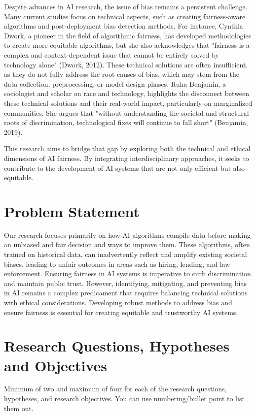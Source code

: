 \documentclass[a4paper, 12pt]{article}
\begin{document}
Despite advances in AI research, the issue of bias remains a persistent challenge. Many current studies focus on technical aspects, such as creating fairness-aware algorithms and post-deployment bias detection methods. For instance, Cynthia Dwork, a pioneer in the field of algorithmic fairness, has developed methodologies to create more equitable algorithms, but she also acknowledges that "fairness is a complex and context-dependent issue that cannot be entirely solved by technology alone" (Dwork, 2012). These technical solutions are often insufficient, as they do not fully address the root causes of bias, which may stem from the data collection, preprocessing, or model design phases. Ruha Benjamin, a sociologist and scholar on race and technology, highlights the disconnect between these technical solutions and their real-world impact, particularly on marginalized communities. She argues that "without understanding the societal and structural roots of discrimination, technological fixes will continue to fall short" (Benjamin, 2019).

This research aims to bridge that gap by exploring both the technical and ethical dimensions of AI fairness. By integrating interdisciplinary approaches, it seeks to contribute to the development of AI systems that are not only efficient but also equitable.


\section{Problem Statement}

 Our research focuses primarily on how AI algorithms compile data before making an unbiased and fair decision and ways to improve them. These algorithms, often trained on historical data, can inadvertently reflect and amplify existing societal biases, leading to unfair outcomes in areas such as hiring, lending, and law enforcement. Ensuring fairness in AI systems is imperative to curb discrimination and maintain public trust. However, identifying, mitigating, and preventing bias in AI remains a complex predicament that requires balancing technical solutions with ethical considerations. Developing robust methods to address bias and ensure fairness is essential for creating equitable and trustworthy AI systems.
 
\section{Research Questions, Hypotheses and Objectives}
Minimum of two and maximum of four for each of the research questions, hypotheses, and research objectives. You can use numbering/bullet point to list them out.\\
\end{document}
